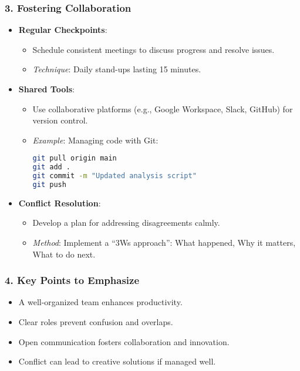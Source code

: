 \documentclass{beamer}
\begin{document}
\begin{frame}[fragile]
    \frametitle{3. Fostering Collaboration}
    \begin{itemize}
        \item \textbf{Regular Checkpoints}:
        \begin{itemize}
            \item Schedule consistent meetings to discuss progress and resolve issues.
            \item \textit{Technique}: Daily stand-ups lasting 15 minutes.
        \end{itemize}

        \item \textbf{Shared Tools}:
        \begin{itemize}
            \item Use collaborative platforms (e.g., Google Workspace, Slack, GitHub) for version control.
            \item \textit{Example}: Managing code with Git:
            \begin{lstlisting}[language=bash]
git pull origin main
git add .
git commit -m "Updated analysis script"
git push
            \end{lstlisting}
        \end{itemize}

        \item \textbf{Conflict Resolution}:
        \begin{itemize}
            \item Develop a plan for addressing disagreements calmly.
            \item \textit{Method}: Implement a “3Ws approach”: What happened, Why it matters, What to do next.
        \end{itemize}
    \end{itemize}
\end{frame}

\begin{frame}[fragile]
    \frametitle{4. Key Points to Emphasize}
    \begin{itemize}
        \item A well-organized team enhances productivity.
        \item Clear roles prevent confusion and overlaps.
        \item Open communication fosters collaboration and innovation.
        \item Conflict can lead to creative solutions if managed well.
    \end{itemize}
\end{frame}
\end{document}
